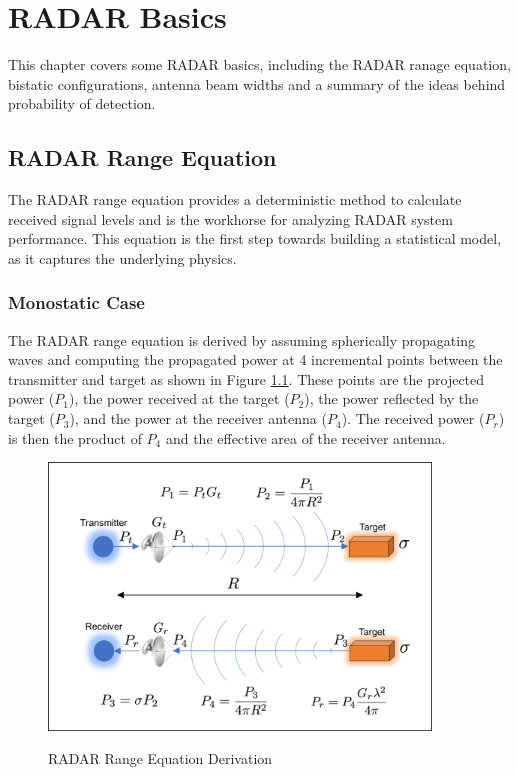 \chapter{RADAR Basics}
This chapter covers some RADAR basics, including the RADAR ranage equation, bistatic configurations, antenna beam widths and a summary of the ideas behind probability of detection.

\section{RADAR Range Equation} 
The RADAR range equation provides a deterministic method to calculate received signal levels and is the workhorse for analyzing RADAR system performance. This equation is the first step towards building a statistical model, as it captures the underlying physics.

\subsection{Monostatic Case}
The RADAR range equation is derived by assuming spherically propagating waves and computing the propagated power at 4 incremental points between the transmitter and target as shown in Figure \ref{intro_fig:1}. These points are the projected power ($P_1$), the power received at the target ($P_2$), the power reflected by the target ($P_3$), and the power at the receiver antenna ($P_4$). The received power ($P_r$) is then the product of $P_4$ and the effective area of the receiver antenna.

\begin{figure}[H]
  \begin{center}
\includegraphics[width=4in]{../media/multistatic/radar_range_equation.png}
  \end{center}
  \renewcommand{\baselinestretch}{1} \small\normalsize
  \begin{quote}
    \caption[RADAR Range Equation Derivation]{RADAR Range Equation Derivation \label{intro_fig:1}}
  \end{quote}
\end{figure}
\renewcommand{\baselinestretch}{2} \small\normalsize


